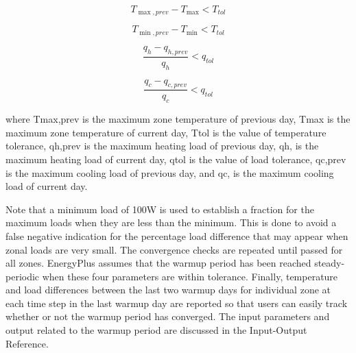 \begin{equation}
{T_{\max ,prev}} - {T_{\max }} < {T_{tol}}
\end{equation}

\begin{equation}
{T_{\min ,prev}} - {T_{\min }} < {T_{tol}}
\end{equation}

\begin{equation}
\frac{{{q_h} - {q_{h,prev}}}}{{{q_h}}} < {q_{tol}}
\end{equation}

\begin{equation}
\frac{{{q_c} - {q_{c,prev}}}}{{{q_c}}} < {q_{tol}}
\end{equation}

where Tmax,prev is the maximum zone temperature of previous day, Tmax is the maximum zone temperature of current day, Ttol is the value of temperature tolerance, qh,prev is the maximum heating load of previous day, qh, is the maximum heating load of current day, qtol is the value of load tolerance, qc,prev is the maximum cooling load of previous day, and qc, is the maximum cooling load of current day.

Note that a minimum load of 100W is used to establish a fraction for the maximum loads when they are less than the minimum. This is done to avoid a false negative indication for the percentage load difference that may appear when zonal loads are very small. The convergence checks are repeated until passed for all zones. EnergyPlus assumes that the warmup period has been reached steady-periodic when these four parameters are within tolerance. Finally, temperature and load differences between the last two warmup days for individual zone at each time step in the last warmup day are reported so that users can easily track whether or not the warmup period has converged. The input parameters and output related to the warmup period are discussed in the Input-Output Reference.

